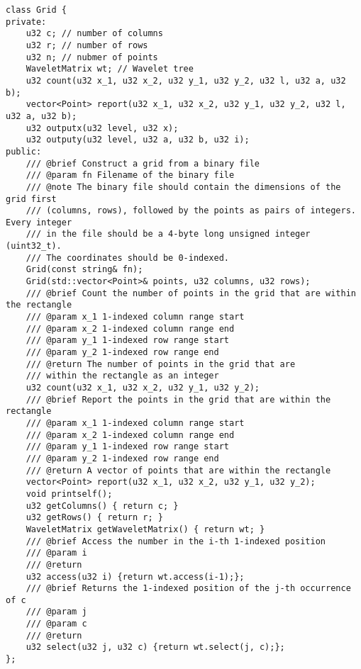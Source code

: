 \begin{lstlisting}[style=cppstyle, caption={Grilla}, label={lst:grid}]
class Grid {
private: 
    u32 c; // number of columns
    u32 r; // number of rows
    u32 n; // nubmer of points
    WaveletMatrix wt; // Wavelet tree
    u32 count(u32 x_1, u32 x_2, u32 y_1, u32 y_2, u32 l, u32 a, u32 b);
    vector<Point> report(u32 x_1, u32 x_2, u32 y_1, u32 y_2, u32 l, u32 a, u32 b);
    u32 outputx(u32 level, u32 x);
    u32 outputy(u32 level, u32 a, u32 b, u32 i);
public:
    /// @brief Construct a grid from a binary file
    /// @param fn Filename of the binary file
    /// @note The binary file should contain the dimensions of the grid first 
    /// (columns, rows), followed by the points as pairs of integers. Every integer
    /// in the file should be a 4-byte long unsigned integer (uint32_t).
    /// The coordinates should be 0-indexed.
    Grid(const string& fn);
    Grid(std::vector<Point>& points, u32 columns, u32 rows);
    /// @brief Count the number of points in the grid that are within the rectangle
    /// @param x_1 1-indexed column range start
    /// @param x_2 1-indexed column range end
    /// @param y_1 1-indexed row range start
    /// @param y_2 1-indexed row range end
    /// @return The number of points in the grid that are
    /// within the rectangle as an integer
    u32 count(u32 x_1, u32 x_2, u32 y_1, u32 y_2);
    /// @brief Report the points in the grid that are within the rectangle
    /// @param x_1 1-indexed column range start
    /// @param x_2 1-indexed column range end
    /// @param y_1 1-indexed row range start
    /// @param y_2 1-indexed row range end
    /// @return A vector of points that are within the rectangle
    vector<Point> report(u32 x_1, u32 x_2, u32 y_1, u32 y_2);
    void printself();
    u32 getColumns() { return c; }
    u32 getRows() { return r; }
    WaveletMatrix getWaveletMatrix() { return wt; }
    /// @brief Access the number in the i-th 1-indexed position
    /// @param i 
    /// @return 
    u32 access(u32 i) {return wt.access(i-1);};
    /// @brief Returns the 1-indexed position of the j-th occurrence of c
    /// @param j 
    /// @param c 
    /// @return 
    u32 select(u32 j, u32 c) {return wt.select(j, c);};
};
\end{lstlisting}
